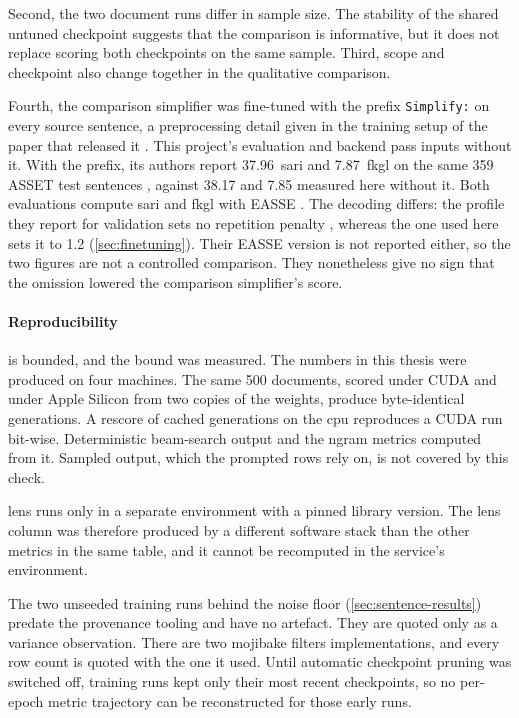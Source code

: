 Second, the two document runs differ in sample size.
The stability of the shared untuned checkpoint suggests that the comparison is informative, but it does not replace scoring both checkpoints on the same sample.
Third, scope and checkpoint also change together in the qualitative comparison.

Fourth, the comparison simplifier was fine-tuned with the prefix \texttt{Simplify:} on every source sentence, a preprocessing detail given in the training setup of the paper that released it \parencite[4]{cohen2026simplify}.
This project's evaluation and backend pass inputs without it.
With the prefix, its authors report \num{37.96}~\gls{sari} and \num{7.87}~\gls{fkgl} on the same \num{359} ASSET test sentences \parencite[3, 6]{cohen2026simplify}, against \num{38.17} and \num{7.85} measured here without it.
Both evaluations compute \gls{sari} and \gls{fkgl} with EASSE \parencite[12]{cohen2026simplify}.
The decoding differs: the profile they report for validation sets no repetition penalty \parencite[12]{cohen2026simplify}, whereas the one used here sets it to \num{1.2} (\cref{sec:finetuning}).
Their EASSE version is not reported either, so the two figures are not a controlled comparison.
They nonetheless give no sign that the omission lowered the comparison simplifier's score.

\pagebreak

\paragraph{Reproducibility} is bounded, and the bound was measured.
The numbers in this thesis were produced on four machines.
The same \num{500} documents, scored under CUDA and under Apple Silicon from two copies of the weights, produce byte-identical generations.
A rescore of cached generations on the \gls{cpu} reproduces a CUDA run bit-wise.
Deterministic beam-search output and the \gls{ngram} metrics computed from it.
Sampled output, which the prompted rows rely on, is not covered by this check.

\Gls{lens} runs only in a separate environment with a pinned library version.
The \gls{lens} column was therefore produced by a different software stack than the other metrics in the same table, and it cannot be recomputed in the service's environment.

The two unseeded training runs behind the noise floor (\cref{sec:sentence-results}) predate the provenance tooling and have no artefact.
They are quoted only as a variance observation.
There are two mojibake filters implementations, and every row count is quoted with the one it used.
Until automatic checkpoint pruning was switched off, training runs kept only their most recent checkpoints, so no per-epoch metric trajectory can be reconstructed for those early runs.

